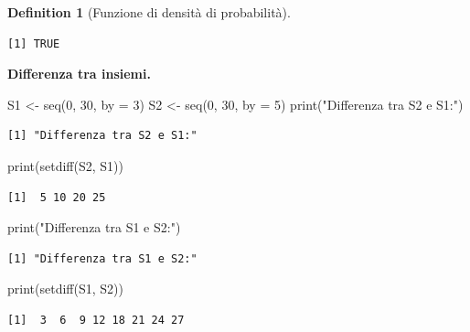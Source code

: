 \documentclass[
  letterpaper,
  DIV=11,
  numbers=noendperiod,
  oneside]{scrreprt}
\newenvironment{Shaded}{\begin{snugshade}}{\end{snugshade}}
\newcommand{\AttributeTok}[1]{\textcolor[rgb]{0.40,0.45,0.13}{#1}}
\newcommand{\DecValTok}[1]{\textcolor[rgb]{0.68,0.00,0.00}{#1}}
\newcommand{\FunctionTok}[1]{\textcolor[rgb]{0.28,0.35,0.67}{#1}}
\newcommand{\NormalTok}[1]{\textcolor[rgb]{0.00,0.23,0.31}{#1}}
\newcommand{\OtherTok}[1]{\textcolor[rgb]{0.00,0.23,0.31}{#1}}
\newcommand{\StringTok}[1]{\textcolor[rgb]{0.13,0.47,0.30}{#1}}
\theoremstyle{definition}
\theoremstyle{plain}
\theoremstyle{definition}
\newtheorem{definition}{Definition}[chapter]
\theoremstyle{remark}
\begin{document}
\begin{definition}[Funzione di densità di
probabilità]
\begin{verbatim}
[1] TRUE
\end{verbatim}

\textbf{Differenza tra insiemi.}

\begin{Shaded}
\begin{Highlighting}[]
\NormalTok{S1 }\OtherTok{\textless{}{-}} \FunctionTok{seq}\NormalTok{(}\DecValTok{0}\NormalTok{, }\DecValTok{30}\NormalTok{, }\AttributeTok{by =} \DecValTok{3}\NormalTok{)}
\NormalTok{S2 }\OtherTok{\textless{}{-}} \FunctionTok{seq}\NormalTok{(}\DecValTok{0}\NormalTok{, }\DecValTok{30}\NormalTok{, }\AttributeTok{by =} \DecValTok{5}\NormalTok{)}
\FunctionTok{print}\NormalTok{(}\StringTok{"Differenza tra S2 e S1:"}\NormalTok{)}
\end{Highlighting}
\end{Shaded}

\begin{verbatim}
[1] "Differenza tra S2 e S1:"
\end{verbatim}

\begin{Shaded}
\begin{Highlighting}[]
\FunctionTok{print}\NormalTok{(}\FunctionTok{setdiff}\NormalTok{(S2, S1))}
\end{Highlighting}
\end{Shaded}

\begin{verbatim}
[1]  5 10 20 25
\end{verbatim}

\begin{Shaded}
\begin{Highlighting}[]
\FunctionTok{print}\NormalTok{(}\StringTok{"Differenza tra S1 e S2:"}\NormalTok{)}
\end{Highlighting}
\end{Shaded}

\begin{verbatim}
[1] "Differenza tra S1 e S2:"
\end{verbatim}

\begin{Shaded}
\begin{Highlighting}[]
\FunctionTok{print}\NormalTok{(}\FunctionTok{setdiff}\NormalTok{(S1, S2))}
\end{Highlighting}
\end{Shaded}

\begin{verbatim}
[1]  3  6  9 12 18 21 24 27
\end{verbatim}


\end{definition}
\end{document}
